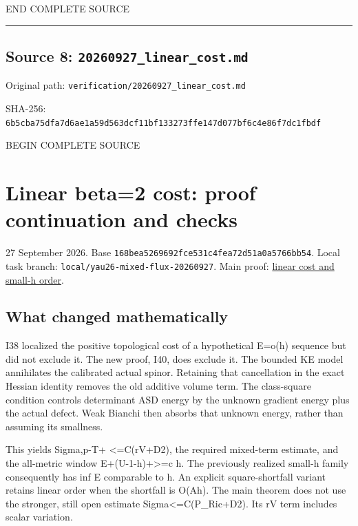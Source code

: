 \documentclass[
  10pt,
]{article}
\begin{document}
END COMPLETE SOURCE

\begin{center}\rule{0.5\linewidth}{0.5pt}\end{center}

\hypertarget{source-8-20260927_linear_cost.md}{%
\subsection{Source 8:
\nolinkurl{20260927_linear_cost.md}}\label{source-8-20260927_linear_cost.md}}

Original path: \nolinkurl{verification/20260927_linear_cost.md}

SHA-256:
\nolinkurl{6b5cba75dfa7d6ae1a59d563dcf11bf133273ffe147d077bf6c4e86f7dc1fbdf}

BEGIN COMPLETE SOURCE

\hypertarget{linear-beta2-cost-proof-continuation-and-checks}{%
\section{Linear beta=2 cost: proof continuation and
checks}\label{linear-beta2-cost-proof-continuation-and-checks}}

27 September 2026. Base
\nolinkurl{168bea5269692fce531c4fea72d51a0a5766bb54}. Local task branch:
\nolinkurl{local/yau26-mixed-flux-20260927}. Main proof:
\href{../continuation/20260927_mixed_current_and_signed_cores.md}{linear
cost and small-h order}.

\hypertarget{what-changed-mathematically-2}{%
\subsection{What changed
mathematically}\label{what-changed-mathematically-2}}

I38 localized the positive topological cost of a hypothetical E=o(h)
sequence but did not exclude it. The new proof, I40, does exclude it.
The bounded KE model annihilates the calibrated actual spinor. Retaining
that cancellation in the exact Hessian identity removes the old additive
volume term. The class-square condition controls determinant ASD energy
by the unknown gradient energy plus the actual defect. Weak Bianchi then
absorbs that unknown energy, rather than assuming its smallness.

This yields Sigma,p-T+ \textless=C(rV+D2), the required mixed-term
estimate, and the all-metric window E+(U-1-h)+\textgreater=c h. The
previously realized small-h family consequently has inf E comparable to
h. An explicit square-shortfall variant retains linear order when the
shortfall is O(Ah). The main theorem does not use the stronger, still
open estimate Sigma\textless=C(P\_Ric+D2). Its rV term includes scalar
variation.
\end{document}
